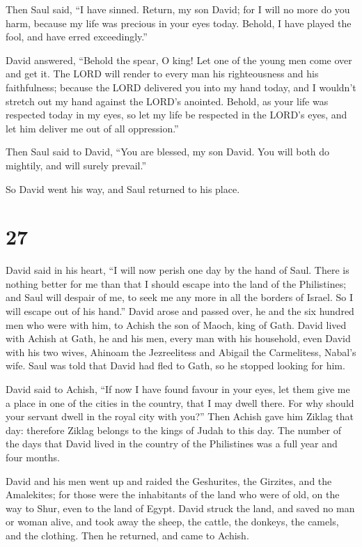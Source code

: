  Then Saul said, ``I have sinned. Return, my son David;
for I will no more do you harm, because my life was precious in your
eyes today. Behold, I have played the fool, and have erred
exceedingly.''

 David answered, ``Behold the spear, O king! Let one of
the young men come over and get it.  The LORD will render
to every man his righteousness and his faithfulness; because the LORD
delivered you into my hand today, and I wouldn't stretch out my hand
against the LORD's anointed.  Behold, as your life was
respected today in my eyes, so let my life be respected in the LORD's
eyes, and let him deliver me out of all oppression.''

 Then Saul said to David, ``You are blessed, my son
David. You will both do mightily, and will surely prevail.''

So David went his way, and Saul returned to his place.

\hypertarget{section-26}{%
\section{27}\label{section-26}}

 David said in his heart, ``I will now perish one day by
the hand of Saul. There is nothing better for me than that I should
escape into the land of the Philistines; and Saul will despair of me, to
seek me any more in all the borders of Israel. So I will escape out of
his hand.''  David arose and passed over, he and the six
hundred men who were with him, to Achish the son of Maoch, king of Gath.
 David lived with Achish at Gath, he and his men, every
man with his household, even David with his two wives, Ahinoam the
Jezreelitess and Abigail the Carmelitess, Nabal's wife. 
Saul was told that David had fled to Gath, so he stopped looking for
him.

 David said to Achish, ``If now I have found favour in
your eyes, let them give me a place in one of the cities in the country,
that I may dwell there. For why should your servant dwell in the royal
city with you?''  Then Achish gave him Ziklag that day:
therefore Ziklag belongs to the kings of Judah to this day.
 The number of the days that David lived in the country of
the Philistines was a full year and four months.

 David and his men went up and raided the Geshurites, the
Girzites, and the Amalekites; for those were the inhabitants of the land
who were of old, on the way to Shur, even to the land of Egypt.
 David struck the land, and saved no man or woman alive,
and took away the sheep, the cattle, the donkeys, the camels, and the
clothing. Then he returned, and came to Achish.

